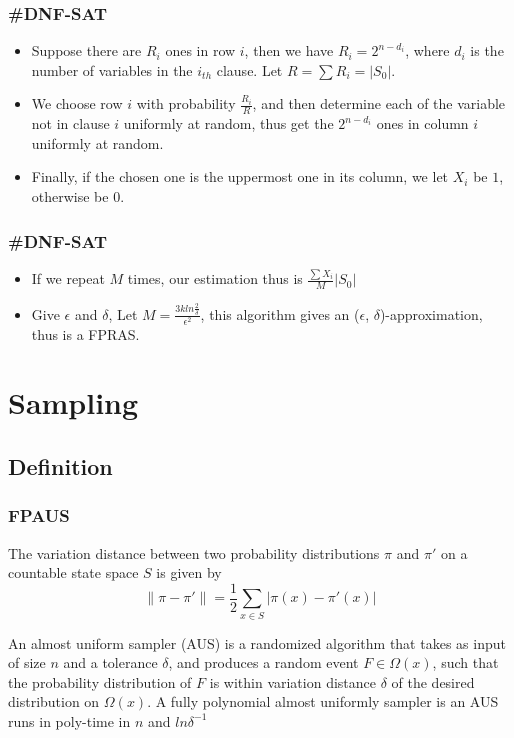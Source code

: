 \documentclass[table, usenames,dvipsnames,svgnames]{beamer}
\begin{document}
\begin{frame}
    \frametitle{\#DNF-SAT}
    \pause
    \begin{itemize}
        \item Suppose there are $R_i$ ones in row $i$, then we have $R_i = 2^{n - d_i}$, where $d_i$ is the number of variables in the $i_{th}$ clause. Let $R = \sum R_i = |S_0|$.\pause
        \item We choose row $i$ with probability $\frac{R_i}{R}$, and then determine each of the variable not in clause $i$ uniformly at random, thus get the $2^{n - d_i}$ ones in column $i$ uniformly at random.\pause
        \item Finally, if the chosen one is the uppermost one in its column, we let $X_i$ be $1$, otherwise be $0$.
    \end{itemize}
\end{frame}

\begin{frame}
    \frametitle{\#DNF-SAT}
    \pause
    \begin{itemize}
        \item If we repeat $M$ times, our estimation thus is $\frac{\sum X_i}{M}|S_0|$ \pause
        \item Give $\epsilon$ and $\delta$, Let $M = \frac{3kln\frac{2}{\delta}}{\epsilon^2}$, this algorithm gives an ($\epsilon$, $\delta$)-approximation, thus is a FPRAS.
    \end{itemize}
\end{frame}


\section{Sampling}

\subsection{Definition}

\begin{frame}
    \frametitle{FPAUS}
    \pause
    \begin{definition}
        The variation distance between two probability distributions $\pi$ and $\pi'$ on a countable state space $S$ is given by 
        $$
        \|\pi - \pi'\| = \frac{1}{2}\sum_{x\in S}|\pi(x) - \pi'(x)|
        $$
    \end{definition}
    \pause
    \begin{definition}[FPAUS]
        An almost uniform sampler (AUS) is a randomized algorithm that takes as input of size $n$ and a tolerance $\delta$, and produces a random event $F \in \Omega(x)$, such that the probability distribution of $F$ is within variation distance $\delta$ of the desired distribution on $\Omega(x)$. A fully polynomial almost uniformly sampler is an AUS runs in poly-time in $n$ and $ln\delta ^{-1}$
    \end{definition}
\end{frame}
\end{document}
